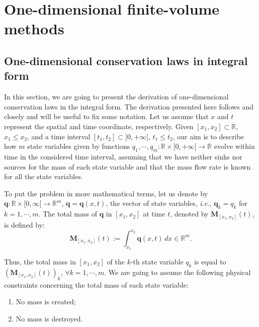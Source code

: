 
\chapter{One-dimensional finite-volume methods}
\label{chp1-1d-fv}
\section{One-dimensional conservation laws in integral form}
\label{chp1-sec1}
In this section, we are going to present the derivation of one-dimensional conservation
laws in the integral form. 
The derivation presented here follows \citet{leveque:1990} and \citet{leveque:2002} closely and will
be useful to fix some notation. 
 Let us assume that $x$ and $t$ represent the spatial and time coordinate, respectively.
Given $[x_1, x_2] \subset \mathbb{R}$, $x_1 \leq x_2$, and a time 
interval $[t_1, t_2] \subset ]0, +\infty[$, $t_1 \leq t_2$, 
our aim is to describe how $m$ state variables given by functions 
$q_1, \cdots, q_m: \mathbb{R}\times[0, +\infty[ \to \mathbb{R}$ 
evolve within time in the considered time interval, assuming that we have neither sinks nor sources 
for the mass of each state variable and that the mass flow rate is known for all the state variables.

To put the problem in more mathematical terms, let us denote by 
$\mathbf{q}: \mathbb{R}\times [0, \infty[\to \mathbb{R}^m$, 
$\mathbf{q} = \mathbf{q}(x,t)$, the vector of state variables,
\textit{i.e.}, $\mathbf{q}_k = q_k$ for $k=1, \cdots, m$.
The total mass of $\mathbf{q}$ in $[x_1, x_2]$ at time $t$, denoted by $\mathbf{M}_{[x_1, x_2]}(t)$, is defined by:
\begin{equation}
	\label{chp1-sec1-eq1}
	\mathbf{M}_{[x_1, x_2]}(t) := \int_{x_1}^{x_2} \mathbf{q}(x,t) \,dx \in \mathbb{R}^m.
\end{equation}

Thus, the total mass in $[x_1, x_2]$ of the $k$-th state variable $q_k$ is equal to
$(\mathbf{M}_{[x_1, x_2]}(t))_k$, $\forall k = 1, \cdots, m$.
We are going to assume the following physical constraints concerning the total mass of each state variable:
\begin{enumerate}
	\item No mass is created;
	\item No mass is destroyed.
\end{enumerate}

